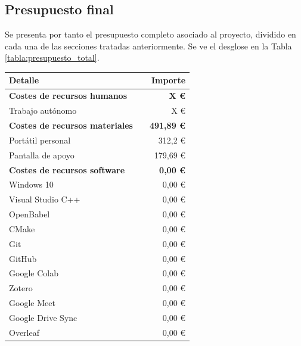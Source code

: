 \subsection{Presupuesto final}
Se presenta por tanto el presupuesto completo asociado al proyecto, dividido en cada una de las secciones tratadas anteriormente. Se ve el desglose en la Tabla \ref{tabla:presupuesto_total}.
\begin{longtable}[c]{lm{2cm}r}
\toprule
\textbf{Detalle}                        && \textbf{Importe} \\
\endfirsthead
%
\endhead
%
\endfoot
%
\endlastfoot
%
\midrule
\textbf{Costes de recursos humanos}     && \textbf{X €} \\
Trabajo autónomo                        && X €          \\
\midrule
\textbf{Costes de recursos materiales}  && \textbf{491,89 €} \\
Portátil personal                       && 312,2 €            \\ %
Pantalla de apoyo                       && 179,69 €             \\ 
\midrule
\textbf{Costes de recursos software}    && \textbf{0,00 €}    \\
Windows 10                              && 0,00 €             \\
Visual Studio C++                       && 0,00 €             \\
OpenBabel                               && 0,00 €             \\
CMake                                   && 0,00 €             \\
Git                                     && 0,00 €             \\
GitHub                                  && 0,00 €             \\
Google Colab                            && 0,00 €             \\
Zotero                                  && 0,00 €             \\
Google Meet                             && 0,00 €             \\
Google Drive Sync                       && 0,00 €             \\
Overleaf                                && 0,00 €             \\

\end{longtable}
